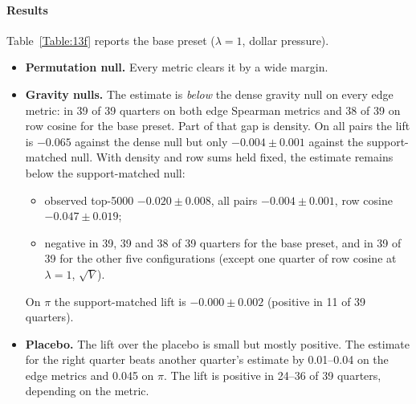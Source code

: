 \documentclass[preprint,3p,twocolumn]{elsarticle}
\begin{document}
\paragraph{Results} Table~\ref{Table:13f} reports the base preset ($\lambda=1$, dollar pressure).
\begin{itemize}
\item \textbf{Permutation null.} Every metric clears it by a wide margin.
\item \textbf{Gravity nulls.} The estimate is \emph{below} the dense gravity null on every edge metric: in 39 of 39 quarters on both edge Spearman metrics and 38 of 39 on row cosine for the base preset. Part of that gap is density. On all pairs the lift is $-0.065$ against the dense null but only $-0.004\pm0.001$ against the support-matched null. With density and row sums held fixed, the estimate remains below the support-matched null:
\begin{itemize}
\item observed top-5000 $-0.020\pm0.008$, all pairs $-0.004\pm0.001$, row cosine $-0.047\pm0.019$;
\item negative in 39, 39 and 38 of 39 quarters for the base preset, and in 39 of 39 for the other five configurations (except one quarter of row cosine at $\lambda=1$, $\sqrt{V}$).
\end{itemize}
On $\pi$ the support-matched lift is $-0.000\pm0.002$ (positive in 11 of 39 quarters).
\item \textbf{Placebo.} The lift over the placebo is small but mostly positive. The estimate for the right quarter beats another quarter's estimate by 0.01--0.04 on the edge metrics and 0.045 on $\pi$. The lift is positive in 24--36 of 39 quarters, depending on the metric.
\end{itemize}
\end{document}
